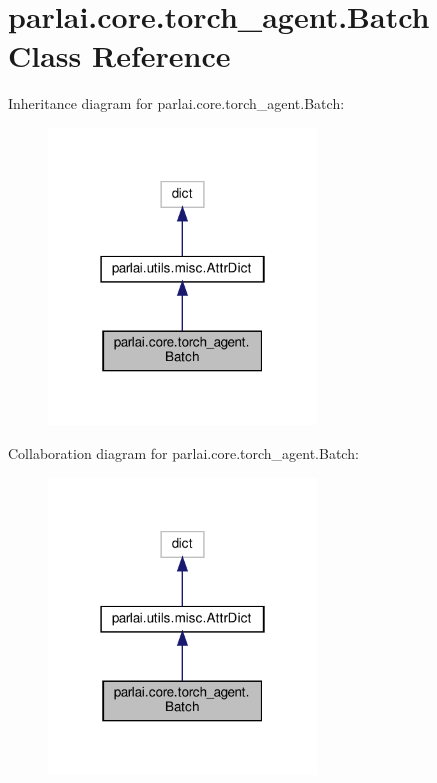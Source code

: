 \hypertarget{classparlai_1_1core_1_1torch__agent_1_1Batch}{}\section{parlai.\+core.\+torch\+\_\+agent.\+Batch Class Reference}
\label{classparlai_1_1core_1_1torch__agent_1_1Batch}


Inheritance diagram for parlai.\+core.\+torch\+\_\+agent.\+Batch\+:
\nopagebreak
\begin{figure}[H]
\begin{center}
\leavevmode
\includegraphics[width=202pt]{da/d3c/classparlai_1_1core_1_1torch__agent_1_1Batch__inherit__graph}
\end{center}
\end{figure}


Collaboration diagram for parlai.\+core.\+torch\+\_\+agent.\+Batch\+:
\nopagebreak
\begin{figure}[H]
\begin{center}
\leavevmode
\includegraphics[width=202pt]{d5/d77/classparlai_1_1core_1_1torch__agent_1_1Batch__coll__graph}
\end{center}
\end{figure}

